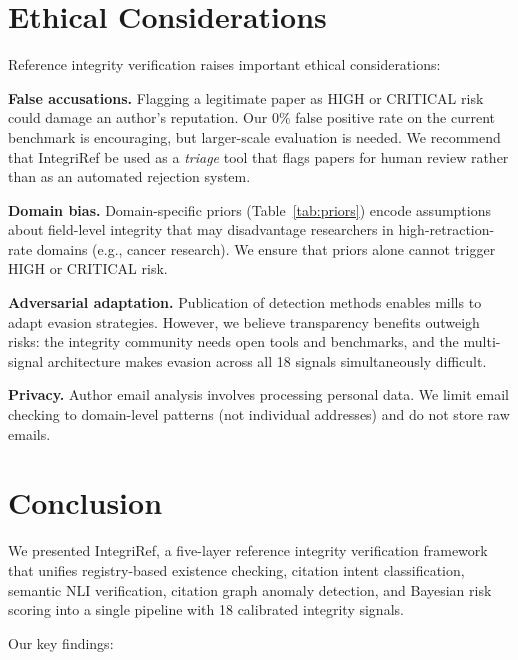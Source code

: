 \documentclass[sigconf,nonacm]{acmart}
\begin{document}
\section{Ethical Considerations}
\label{sec:ethics}

Reference integrity verification raises important ethical considerations:

\textbf{False accusations.}
Flagging a legitimate paper as HIGH or CRITICAL risk could damage an author's reputation.
Our 0\% false positive rate on the current benchmark is encouraging, but larger-scale evaluation is needed.
We recommend that IntegriRef be used as a \emph{triage} tool that flags papers for human review rather than as an automated rejection system.

\textbf{Domain bias.}
Domain-specific priors (Table~\ref{tab:priors}) encode assumptions about field-level integrity that may disadvantage researchers in high-retraction-rate domains (e.g., cancer research).
We ensure that priors alone cannot trigger HIGH or CRITICAL risk.

\textbf{Adversarial adaptation.}
Publication of detection methods enables mills to adapt evasion strategies.
However, we believe transparency benefits outweigh risks: the integrity community needs open tools and benchmarks, and the multi-signal architecture makes evasion across all 18 signals simultaneously difficult.

\textbf{Privacy.}
Author email analysis involves processing personal data.
We limit email checking to domain-level patterns (not individual addresses) and do not store raw emails.

\section{Conclusion}
\label{sec:conclusion}

We presented IntegriRef, a five-layer reference integrity verification framework that unifies registry-based existence checking, citation intent classification, semantic NLI verification, citation graph anomaly detection, and Bayesian risk scoring into a single pipeline with 18 calibrated integrity signals.

Our key findings:
\end{document}
